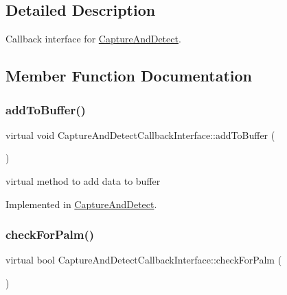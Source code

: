 \subsection{Detailed Description}
Callback interface for \hyperlink{classCaptureAndDetect}{Capture\+And\+Detect}. 

\subsection{Member Function Documentation}
\mbox{\label{classCaptureAndDetectCallbackInterface_a259dc71fd5d02424b91906d708e7de1f}} 
\subsubsection{\texorpdfstring{add\+To\+Buffer()}{addToBuffer()}}
{\footnotesize\ttfamily virtual void Capture\+And\+Detect\+Callback\+Interface\+::add\+To\+Buffer (\begin{DoxyParamCaption}\item[{\hyperlink{classFingerAndCoordinates}{Finger\+And\+Coordinates}}]{ }\end{DoxyParamCaption})\hspace{0.3cm}{\ttfamily [pure virtual]}}



virtual method to add data to buffer 



Implemented in \hyperlink{classCaptureAndDetect_af376ab5418f7b235ee181d574da71fd6}{Capture\+And\+Detect}.

\mbox{\label{classCaptureAndDetectCallbackInterface_a64755838dd5592bae3ca06b4c5a0d72f}} 
\subsubsection{\texorpdfstring{check\+For\+Palm()}{checkForPalm()}}
{\footnotesize\ttfamily virtual bool Capture\+And\+Detect\+Callback\+Interface\+::check\+For\+Palm (\begin{DoxyParamCaption}{ }\end{DoxyParamCaption})\hspace{0.3cm}{\ttfamily [pure virtual]}}



